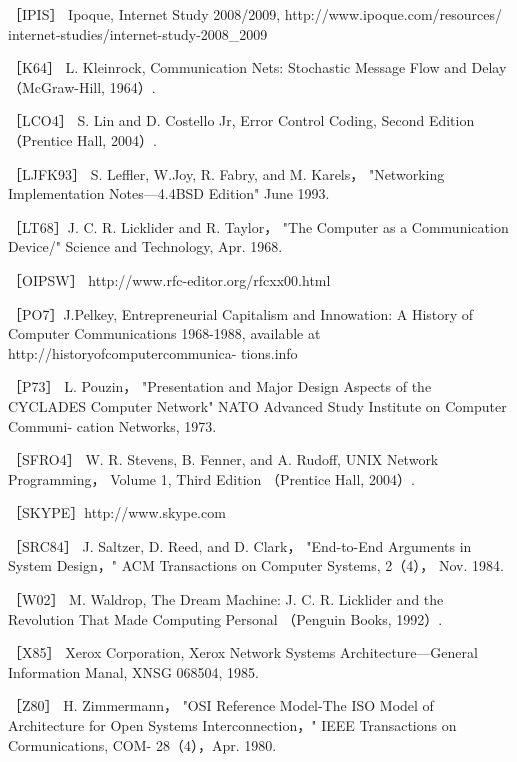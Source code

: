 ［IPIS］ Ipoque, Internet Study 2008/2009, http://www.ipoque.com/resources/
internet-studies/internet-study-2008_2009

［K64］ L. Kleinrock, Communication Nets: Stochastic Message Flow and Delay
（McGraw-Hill, 1964）.

［LCO4］ S. Lin and D. Costello Jr, Error Control Coding, Second Edition （Prentice
Hall, 2004）.

［LJFK93］ S. Leffler, W.Joy, R. Fabry, and M. Karels， "Networking Implementation
Notes—4.4BSD Edition" June 1993.

［LT68］J. C. R. Licklider and R. Taylor， "The Computer as a Communication
Device/" Science and Technology, Apr. 1968.

［OIPSW］ http://www.rfc-editor.org/rfcxx00.html

［PO7］J.Pelkey, Entrepreneurial Capitalism and Innowation: A History of Computer
Communications 1968-1988, available at http://historyofcomputercommunica-
tions.info

［P73］ L. Pouzin， "Presentation and Major Design Aspects of the CYCLADES
Computer Network" NATO Advanced Study Institute on Computer Communi-
cation Networks, 1973.

［SFRO4］ W. R. Stevens, B. Fenner, and A. Rudoff, UNIX Network Programming，
Volume 1, Third Edition （Prentice Hall, 2004）.

［SKYPE］http://www.skype.com

［SRC84］ J. Saltzer, D. Reed, and D. Clark， "End-to-End Arguments in System
Design，" ACM Transactions on Computer Systems, 2（4）， Nov. 1984.

［W02］ M. Waldrop, The Dream Machine: J. C. R. Licklider and the Revolution That
Made Computing Personal （Penguin Books, 1992）.

［X85］ Xerox Corporation, Xerox Network Systems Architecture—General Information
Manal, XNSG 068504, 1985.

［Z80］ H. Zimmermann， "OSI Reference Model-The ISO Model of Architecture
for Open Systems Interconnection，" IEEE Transactions on Cormunications, COM-
28（4），Apr. 1980.
\fi